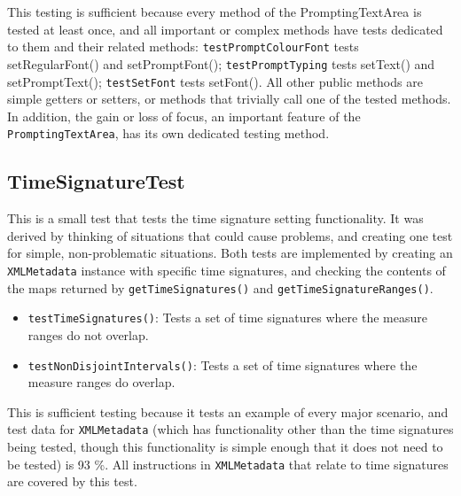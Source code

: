 \documentclass[11pt]{article}
\begin{document}
This testing is sufficient because every method of the PromptingTextArea is tested at least once, and all important or complex methods have tests dedicated to them and their related methods: \texttt{testPromptColourFont} tests setRegularFont() and setPromptFont(); \texttt{testPromptTyping} tests setText() and setPromptText(); \texttt{testSetFont} tests setFont().  All other public methods are simple getters or setters, or methods that trivially call one of the tested methods.  In addition, the gain or loss of focus, an important feature of the \texttt{PromptingTextArea}, has its own dedicated testing method.\\
\subsection{TimeSignatureTest}
\label{sec:org3c1012c}
This is a small test that tests the time signature setting functionality.  It was derived by thinking of situations that could cause problems, and creating one test for simple, non-problematic situations.  Both tests are implemented by creating an \texttt{XMLMetadata} instance with specific time signatures, and checking the contents of the maps returned by \texttt{getTimeSignatures()} and \texttt{getTimeSignatureRanges()}.\\
\begin{itemize}
\item \texttt{testTimeSignatures()}: Tests a set of time signatures where the measure ranges do not overlap.\\
\item \texttt{testNonDisjointIntervals()}: Tests a set of time signatures where the measure ranges do overlap.\\
\end{itemize}

This is sufficient testing because it tests an example of every major scenario, and test data for \texttt{XMLMetadata} (which has functionality other than the time signatures being tested, though this functionality is simple enough that it does not need to be tested) is 93 \%.  All instructions in \texttt{XMLMetadata} that relate to time signatures are covered by this test.\\
\end{document}
